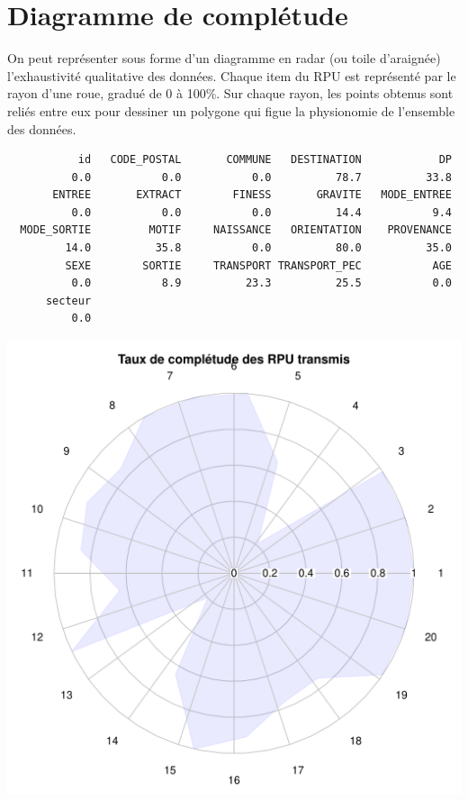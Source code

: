 \documentclass[12pt,english,french,twoside]{book}\usepackage[]{graphicx}\usepackage[]{color}
\makeatletter
\def\maxwidth{ %
  \ifdim\Gin@nat@width>\linewidth
    \linewidth
  \else
    \Gin@nat@width
  \fi
}
\newenvironment{kframe}{%
 \def\at@end@of@kframe{}%
 \ifinner\ifhmode%
  \def\at@end@of@kframe{\end{minipage}}%
  \begin{minipage}{\columnwidth}%
 \fi\fi%
 \def\FrameCommand##1{\hskip\@totalleftmargin \hskip-\fboxsep
 \colorbox{shadecolor}{##1}\hskip-\fboxsep
     \hskip-\linewidth \hskip-\@totalleftmargin \hskip\columnwidth}%
 \MakeFramed {\advance\hsize-\width
   \@totalleftmargin\z@ \linewidth\hsize
   \@setminipage}}%
 {\par\unskip\endMakeFramed%
 \at@end@of@kframe}
\newenvironment{knitrout}{}{} %
\makeatother
\begin{document}
\section{Diagramme de complétude}

On peut représenter sous forme d'un diagramme en radar (ou toile d'araignée) l'exhaustivité qualitative des données. Chaque item du RPU est représenté par le rayon d'une roue, gradué de 0 à 100\%. Sur chaque rayon, les points obtenus sont reliés entre eux pour dessiner un polygone qui figue la physionomie de l'ensemble des données.

\begin{knitrout}
\color{fgcolor}\begin{kframe}
\begin{verbatim}
           id   CODE_POSTAL       COMMUNE   DESTINATION            DP 
          0.0           0.0           0.0          78.7          33.8 
       ENTREE       EXTRACT        FINESS       GRAVITE   MODE_ENTREE 
          0.0           0.0           0.0          14.4           9.4 
  MODE_SORTIE         MOTIF     NAISSANCE   ORIENTATION    PROVENANCE 
         14.0          35.8           0.0          80.0          35.0 
         SEXE        SORTIE     TRANSPORT TRANSPORT_PEC           AGE 
          0.0           8.9          23.3          25.5           0.0 
      secteur 
          0.0 
\end{verbatim}
\end{kframe}
\includegraphics[width=\maxwidth]{figure/radar} 

\end{knitrout}
\end{document}
